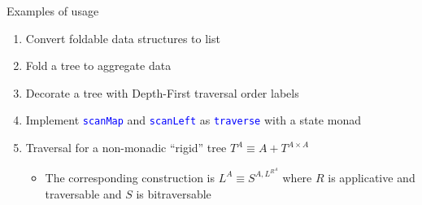 \documentclass[english]{beamer}
\begin{document}
\begin{frame}{Examples of usage}
\begin{enumerate}
\item \vspace{-0.15cm}Convert foldable data structures to list
\item Fold a tree to aggregate data
\item Decorate a tree with Depth-First traversal order labels
\item Implement \texttt{\textcolor{blue}{\footnotesize{}scanMap}} and \texttt{\textcolor{blue}{\footnotesize{}scanLeft}}
as \texttt{\textcolor{blue}{\footnotesize{}traverse}} with a state
monad
\item Traversal for a non-monadic ``rigid'' tree $T^{A}\equiv A+T^{A\times A}$
\begin{itemize}
\item The corresponding construction is $L^{A}\equiv S^{A,L^{R^{A}}}$ where
$R$ is applicative and traversable and $S$ is bitraversable
\end{itemize}
\end{enumerate}
\end{frame}
\end{document}
